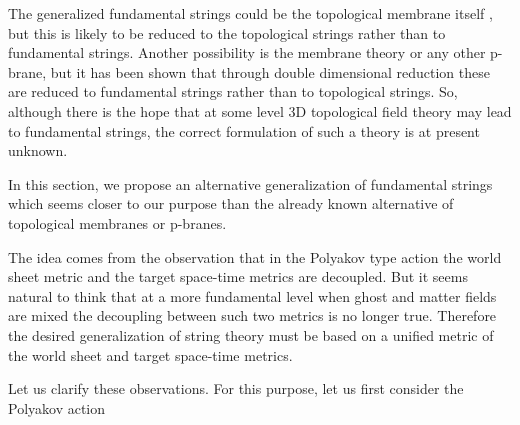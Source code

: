 \documentclass[a4paper,12pt]{article}
\begin{document}
The generalized fundamental strings could be the topological membrane\coordHE{}
itself , but this is likely to be reduced to the topological strings rather
than to fundamental strings. Another possibility is the membrane theory or
any other p-brane\coordHE{}, but it has been shown\coordHE{} that through double
dimensional reduction these are reduced to fundamental strings rather than
to topological strings. So, although there is the hope that at some level 3D
topological field theory may lead to fundamental strings, the correct
formulation of such a theory is at present unknown.

In this section, we propose an alternative generalization of fundamental
strings which seems closer to our purpose than the already known alternative
of topological membranes or p-branes.

The idea comes from the observation that in the Polyakov type action the
world sheet metric and the target space-time metrics are decoupled. But it
seems natural to think that at a more fundamental level when ghost and
matter fields are mixed the decoupling between such two metrics is no longer
true. Therefore the desired generalization of string theory must be based on
a unified metric of the world sheet and target space-time metrics.

Let us clarify these observations. For this purpose, let us first consider
the Polyakov action
\end{document}

